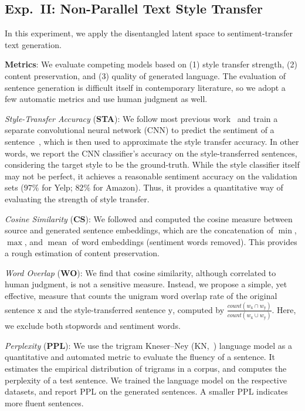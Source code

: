 \documentclass[11pt,a4paper]{article}
\begin{document}
\subsection{Exp.~II: Non-Parallel Text Style Transfer}
In this experiment, we apply the disentangled latent space to sentiment-transfer text generation.

\textbf{Metrics}: We evaluate competing models based on (1) style transfer strength, (2) content preservation, and (3) quality of generated language. The evaluation of sentence generation is difficult itself in contemporary literature, so we adopt a few automatic metrics and use human judgment as well.

\textit{Style-Transfer Accuracy} (\textbf{STA}):
We follow most previous work~\cite{hu2017toward,shen2017style,fu2018style} and train a separate convolutional neural network (CNN) to predict the sentiment of a sentence~\cite{kim2014convolutional}, which is then used to approximate the style transfer accuracy.
In other words, we report the CNN classifier's accuracy on the style-transferred sentences, considering the target style to be the ground-truth.
While the style classifier itself may not be perfect, it achieves a reasonable sentiment accuracy on the validation sets ($97\%$ for Yelp; $82\%$ for Amazon).
Thus, it provides a quantitative way of evaluating the strength of style transfer.

\textit{Cosine Similarity} (\textbf{CS}):
We followed \citet{fu2018style} and computed the cosine measure between source and generated sentence embeddings, which are the concatenation of $\operatorname{min}$, $\operatorname{max}$, and $\operatorname{mean}$ of word embeddings (sentiment words removed).
This provides a rough estimation of content preservation.

\textit{Word Overlap} (\textbf{WO}):
We find that cosine similarity, although correlated to human judgment, is not a sensitive measure.
Instead, we propose a simple, yet effective, measure that counts the unigram word overlap rate of the original sentence $\mathrm x$ and the style-transferred sentence $\mathrm y$, computed by $\frac{count(w_{\mathrm x} \cap w_{\mathrm y})}{count(w_{\mathrm x} \cup w_{\mathrm y})}$.
Here, we exclude both stopwords and sentiment words.


\textit{Perplexity} (\textbf{PPL}): We use the trigram Kneser--Ney (KN,~\citeyear{kneser1995improved}) language model as a quantitative and automated metric to evaluate the fluency of a sentence.
It estimates the empirical distribution of trigrams in a corpus, and computes the perplexity of a test sentence.
We trained the language model on the respective datasets, and report PPL on the generated sentences. A smaller PPL indicates more fluent sentences.
\end{document}
